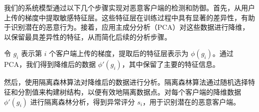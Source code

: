 \documentclass[conference]{IEEEtran}
\begin{document}

我们的系统模型通过以下几个步骤实现对恶意客户端的检测和防御。首先，从用户上传的梯度中提取敏感特征层。这些特征层在训练过程中具有显著的差异性，有助于识别潜在的恶意行为。接着，应用主成分分析（PCA）对这些数据进行降维，以保留最具差异性的特征，从而简化后续的分析步骤。

令 $g_i$ 表示第 $i$ 个客户端上传的梯度，提取后的特征层表示为 $\phi(g_i)$。通过PCA，我们得到降维后的数据 $\phi'(g_i)$，其中保留了主要的特征信息。

然后，使用隔离森林算法对降维后的数据进行分析。隔离森林算法通过随机选择特征和分割值来构建树结构，以便有效地隔离数据点。对每个客户端的降维数据 $\phi'(g_i)$ 进行隔离森林分析，得到异常评分 $s_i$，用于识别潜在的恶意客户端。
\end{document}
